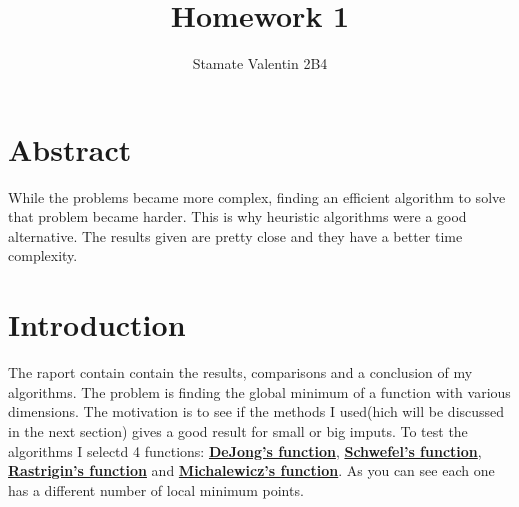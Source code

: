 \documentclass[12pt]{article}
\title{Homework 1}
\author{Stamate Valentin 2B4}
\begin{document}
\maketitle

\section*{Abstract}

While the problems became more complex, finding an efficient algorithm to solve that problem became harder.
This is why heuristic algorithms were a good alternative. The results given are pretty close and they have a better time complexity.

\section{Introduction}

The raport contain contain the results, comparisons and a conclusion of my algorithms. The problem is finding the global minimum of a function with various dimensions.
The motivation is to see if the methods I used(hich will be discussed in the next section) gives a good result for small or big imputs.
To test the algorithms I selectd 4 functions: \href{http://www.geatbx.com/docu/fcnindex-01.html#P89_3085}{\textbf{DeJong's function}}, \href{http://www.geatbx.com/docu/fcnindex-01.html#P150_6749}{\textbf{Schwefel's function}},
\href{http://www.geatbx.com/docu/fcnindex-01.html#P140_6155}{\textbf{Rastrigin's function}} and \href{http://www.geatbx.com/docu/fcnindex-01.html#P204_10395}{\textbf{Michalewicz's function}}. As you can see each one has a
different number of local minimum points.
\end{document}
